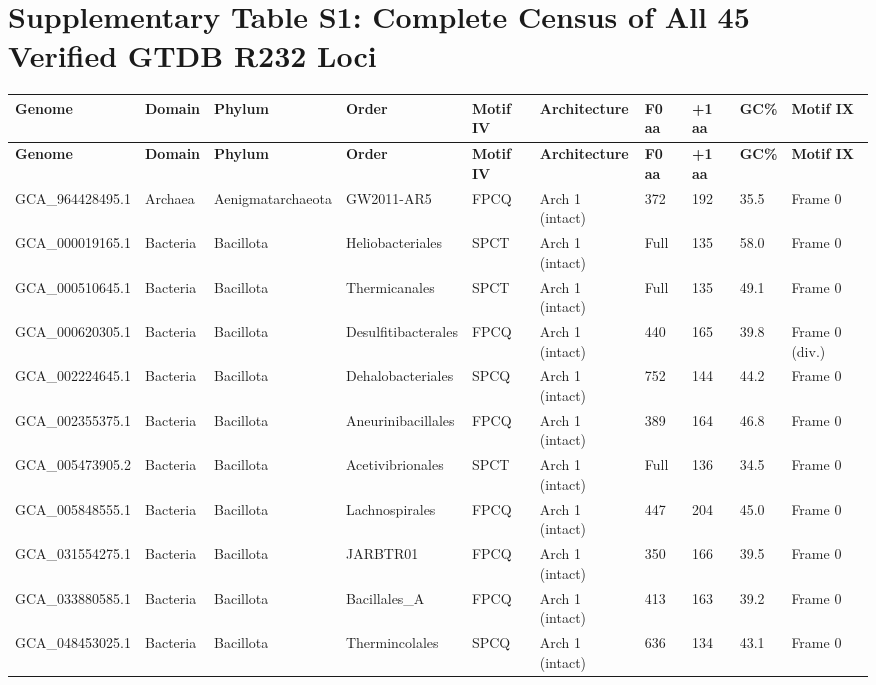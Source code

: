 \documentclass[10pt,letterpaper]{article}
\begin{document}
\section*{Supplementary Table S1: Complete Census of All 45 Verified GTDB R232 Loci}
{\scriptsize\setlength{\tabcolsep}{3.2pt}\renewcommand{\arraystretch}{1.10}
\begin{longtable}{@{}llllllllll@{}}
\toprule
\textbf{Genome} & \textbf{Domain} & \textbf{Phylum} & \textbf{Order} & \textbf{Motif IV} & \textbf{Architecture} & \textbf{F0 aa} & \textbf{+1 aa} & \textbf{GC\%} & \textbf{Motif IX} \\
\midrule
\endfirsthead
\toprule
\textbf{Genome} & \textbf{Domain} & \textbf{Phylum} & \textbf{Order} & \textbf{Motif IV} & \textbf{Architecture} & \textbf{F0 aa} & \textbf{+1 aa} & \textbf{GC\%} & \textbf{Motif IX} \\
\midrule
\endhead
\bottomrule
\endfoot
GCA\_964428495.1 & Archaea & Aenigmatarchaeota & GW2011-AR5 & FPCQ & Arch 1 (intact) & 372 & 192 & 35.5 & Frame 0 \\
GCA\_000019165.1 & Bacteria & Bacillota & Heliobacteriales & SPCT & Arch 1 (intact) & Full & 135 & 58.0 & Frame 0 \\
GCA\_000510645.1 & Bacteria & Bacillota & Thermicanales & SPCT & Arch 1 (intact) & Full & 135 & 49.1 & Frame 0 \\
GCA\_000620305.1 & Bacteria & Bacillota & Desulfitibacterales & FPCQ & Arch 1 (intact) & 440 & 165 & 39.8 & Frame 0 (div.) \\
GCA\_002224645.1 & Bacteria & Bacillota & Dehalobacteriales & SPCQ & Arch 1 (intact) & 752 & 144 & 44.2 & Frame 0 \\
GCA\_002355375.1 & Bacteria & Bacillota & Aneurinibacillales & FPCQ & Arch 1 (intact) & 389 & 164 & 46.8 & Frame 0 \\
GCA\_005473905.2 & Bacteria & Bacillota & Acetivibrionales & SPCT & Arch 1 (intact) & Full & 136 & 34.5 & Frame 0 \\
GCA\_005848555.1 & Bacteria & Bacillota & Lachnospirales & FPCQ & Arch 1 (intact) & 447 & 204 & 45.0 & Frame 0 \\
GCA\_031554275.1 & Bacteria & Bacillota & JARBTR01 & FPCQ & Arch 1 (intact) & 350 & 166 & 39.5 & Frame 0 \\
GCA\_033880585.1 & Bacteria & Bacillota & Bacillales\_A & FPCQ & Arch 1 (intact) & 413 & 163 & 39.2 & Frame 0 \\
GCA\_048453025.1 & Bacteria & Bacillota & Thermincolales & SPCQ & Arch 1 (intact) & 636 & 134 & 43.1 & Frame 0 \\

\end{longtable}}
\end{document}

